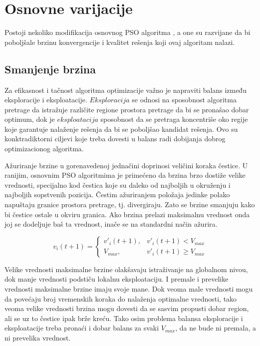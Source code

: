 \documentclass[a4paper]{article}
\begin{document}
\section{Osnovne varijacije}
Postoji nekoliko modifikacija osnovnog PSO algoritma \cite{rini2011particle}, a one su razvijane da bi poboljšale brzinu konvergencije i kvalitet rešenja koji ovaj algoritam nalazi.

\subsection{Smanjenje brzina}
Za efikasnost i tačnost algoritma optimizacije važno je napraviti balans između eksploracije i eksploatacije. 
$Eksploracija$ se odnosi na sposobnost algoritma pretrage da istražuje različite regione prostora pretrage da bi se pronašao dobar optimum, dok je $eksploatacija$ sposobnost  da se pretraga koncentriše oko regije koje garantuje nalaženje rešenja da bi se poboljšao kandidat rešenja. Ovo su konktradiktorni ciljevi koje treba dovesti u balans radi dobijanja dobrog optimizacionog algoritma.

Ažuriranje brzine u gorenavedenoj jednačini doprinosi veličini koraka čestice. U ranijim, osnovnim PSO algoritmima je primećeno da brzina brzo dostiže velike vrednosti, specijalno kod čestica koje su daleko od najboljih u okruženju i najboljih sopstvenih pozicija. Čestim ažuriranjem položaja jedinke polako napuštaju granice prostora pretrage, tj. divergiraju. Zato se brzine smanjuju kako bi čestice ostale u okviru granica. Ako brzina prelazi maksimalnu vrednost onda joj se dodeljuje baš ta vrednost, inače se na standardni način ažurira.

\begin{equation}
    v_i(t+1) = \begin{cases}
                
            v'_i(t+1),  &  v'_i(t+1) < V_{max}\\
            V_{max},  &   v'_i(t+1) \geq V_{max}
           
             \end{cases}
\end{equation}

Velike vrednosti maksimalne brzine olakšavaju istraživanje na globalnom nivou, dok manje vrednosti podstiču lokalnu eksploataciju. I premale i prevelike vrednosti maksimalne brzine imaju svoje mane. Dok veoma male vrednosti mogu da povećaju broj vremenskih koraka do nalaženja optimalne vrednosti, tako veoma velike vrednosti brzina mogu dovesti da se sasvim propusti dobar region, ali se uz to čestice ipak brže kreću. 
Tako osim problema balansa eksploracije i eksploatacije treba pronaći i dobar balans za svaki $V_{max}$, da ne bude ni premala, a ni prevelika vrednost.
\end{document}

